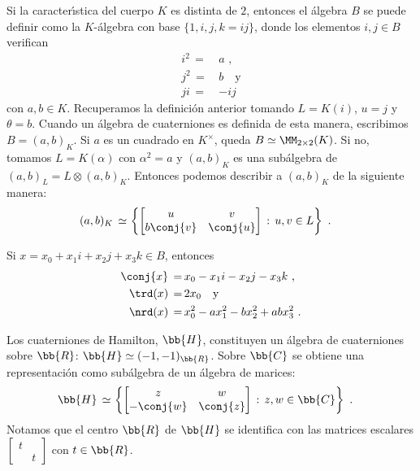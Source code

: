 Si la caracter\'{\i}stica del cuerpo $K$ es distinta de $2$, entonces
el \'{a}lgebra $B$ se puede definir como la $K$-\'{a}lgebra con base
$\{1,i,j,k=ij\}$, donde los elementos $i,j\in B$ verifican
\begin{align*}
 i^{2} \,=\, & a \text{ ,} \\
 j^{2} \,=\, & b \quad\text{y} \\
 ji \,=\, & -ij
\end{align*}
%
con $a,b\in K$. Recuperamos la definici\'{o}n anterior tomando
$L=K(i)$, $u=j$ y $\theta=b$. Cuando un \'{a}lgebra de cuaterniones
es definida de esta manera, escribimos $B=(a,b)_{K}$.
Si $a$ es un cuadrado en $K^{\times}$, queda $B\simeq\MM_{2\times 2}(K)$.
Si no, tomamos $L=K(\alpha)$ con $\alpha^{2}=a$ y $(a,b)_{K}$ es
una sub\'{a}lgebra de $(a,b)_{L}=L\otimes (a,b)_{K}$. Entonces podemos
describir a $(a,b)_{K}$ de la siguiente manera:
\begin{align*}
 (a,b)_{K} \,\simeq\, & \left\lbrace \begin{bmatrix} u & v \\
					b\conj{v} & \conj{u} \end{bmatrix}
	\,:\, u,v\in L\right\rbrace
	\text{ .}
\end{align*}
%

Si $x=x_{0}+x_{1}i+x_{2}j+x_{3}k\in B$, entonces
\begin{align*}
 \conj{x} \,=\, & x_{0} - x_{1} i - x_{2} j - x_{3} k \text{ ,} \\
 \trd(x) \,=\, & 2x_{0} \quad\text{y} \\
 \nrd(x) \,=\, & x_{0}^{2} - a x_{1}^{2} - b x_{2}^{2} + ab x_{3}^{2}
 \text{ .}
\end{align*}
%

\begin{ejemploHamilton}
Los cuaterniones de Hamilton, $\bb{H}$, constituyen un \'{a}lgebra de
cuaterniones sobre $\bb{R}$: $\bb{H}\simeq (-1,-1)_{\bb{R}}$. Sobre $\bb{C}$
se obtiene una representaci\'{o}n como sub\'{a}lgebra de un \'{a}lgebra de
marices:
\begin{align*}
 \bb{H}\,\simeq\, & \left\lbrace \begin{bmatrix} z & w \\
					-\conj{w} & \conj{z} \end{bmatrix}
	\,:\,z,w\in\bb{C}\right\rbrace\text{ .}
\end{align*}
%
Notamos que el centro $\bb{R}$ de $\bb{H}$ se identifica con las matrices
escalares $\begin{bmatrix} t & \\ & t \end{bmatrix}$ con $t\in\bb{R}$.
\end{ejemploHamilton}


